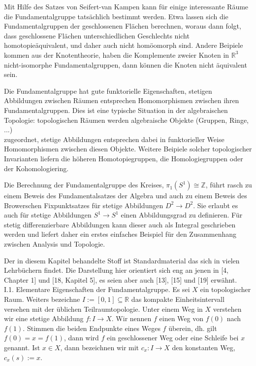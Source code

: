 \documentclass[10pt]{article}
\begin{document}
Mit Hilfe des Satzes von Seifert-van Kampen kann für einige interessante Räume die Fundamentalgruppe tatsächlich bestimmt werden. Etwa lassen sich die Fundamentalgruppen der geschlossenen Flächen berechnen, woraus dann folgt, dass geschlossene Flächen unterschiedlichen Geschlechts nicht homotopieäquivalent, und daher auch nicht homöomorph sind. Andere Beipiele kommen aus der Knotentheorie, haben die Komplemente zweier Knoten in $\mathbb{R}^{3}$ nicht-isomorphe Fundamentalgruppen, dann können die Knoten nicht äquivalent sein.

Die Fundamentalgruppe hat gute funktorielle Eigenschaften, stetigen Abbildungen zwischen Räumen entsprechen Homomorphismen zwischen ihren Fundamentalgruppen. Dies ist eine typische Situation in der algebraischen Topologie: topologischen Räumen werden algebraische Objekte (Gruppen, Ringe, ...)\\
zugeordnet, stetige Abbildungen entsprechen dabei in funktorieller Weise Homomorphismen zwischen diesen Objekte. Weitere Beipiele solcher topologischer Invarianten liefern die höheren Homotopiegruppen, die Homologiegruppen oder der Kohomologiering.

Die Berechnung der Fundamentalgruppe des Kreises, $\pi_{1}\left(S^{1}\right) \cong \mathbb{Z}$, führt rasch zu einem Beweis des Fundamentalsatzes der Algebra und auch zu einem Beweis des Browerschen Fixpunktsatzes für stetige Abbildungen $D^{2} \rightarrow D^{2}$. Sie erlaubt es auch für stetige Abbildungen $S^{1} \rightarrow S^{1}$ einen Abbildungsgrad zu definieren. Für stetig differenzierbare Abbildungen kann dieser auch als Integral geschrieben werden und liefert daher ein erstes einfaches Beispiel für den Zusammenhang zwischen Analysis und Topologie.

Der in diesem Kapitel behandelte Stoff ist Standardmaterial das sich in vielen Lehrbüchern findet. Die Darstellung hier orientiert sich eng an jenen in [4, Chapter 1] und [18, Kapitel 5], es seien aber auch [13], [15] und [19] erwähnt.\\
I.1. Elementare Eigenschaften der Fundamentalgruppe. Es sei $X$ ein topologischer Raum. Weiters bezeichne $I:=[0,1] \subseteq \mathbb{R}$ das kompakte Einheitsintervall versehen mit der üblichen Teilraumtopologie. Unter einem Weg in $X$ verstehen wir eine stetige Abbildung $f: I \rightarrow X$. Wir nennen $f$ einen Weg von $f(0)$ nach $f(1)$. Stimmen die beiden Endpunkte eines Weges $f$ überein, dh. gilt $f(0)=x=f(1)$, dann wird $f$ ein geschlossener Weg oder eine Schleife bei $x$ genannt. Ist $x \in X$, dann bezeichnen wir mit $c_{x}: I \rightarrow X$ den konstanten Weg, $c_{x}(s):=x$.
\end{document}
